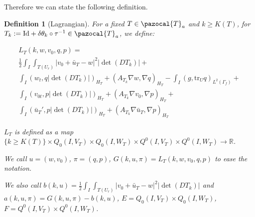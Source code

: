 \documentclass[english,a4paper,10pt,oneside]{scrbook}	%
\theoremstyle{break}
\newtheorem{defn}[equation]{Definition}
\theoremstyle{remark}
\newcommand{\mR}{\mathbb{R}}
\newcommand{\tr}{\text{tr}}
\newcommand{\cT}{\pazocal{T}}
\newcommand{\id}{\text{Id}}
\newcommand{\te}{\theta}
\begin{document}
Therefore we can state the following definition.

\begin{defn}[Lagrangian]

For a fixed $T \in \cT_a$ and  $k\geq K(T)$, for $T_k:=\id+\delta\te_k \circ \tau^{-1} \in \cT_a$, we define:

\begin{align*}
L_T(k,w,v_0,q,p) = \\
\frac{1}{2}\int_I \int_{T(U_r)}|v_0+\bar{u}_T - w|^2|\det(DT_k)|+\\
\int_I ( w_t , q |\det(DT_k)|)_{H_T}+ (A_{T_k}\nabla w, \nabla q)_{H_T} -\int_I(g,\tr_{U} q)_{L^2(\Gamma_f)} +\\ \int_I (v_{0t},p |\det(DT_k)|)_{H_T} + (A_{T_k} \nabla v_0, \nabla p)_{H_T}+\\\int_I(\bar{u}_T',p|\det(DT_k)|)_{H_T}+(A_{T_k} \nabla \bar{u}_T , \nabla p)_{H_T}
\end{align*}

$L_T$ is defined as a map $\{k\geq K(T)\}\times Q_0(I, V_T)\times Q_0(I,W_T)\times Q^0(I, V_T)\times Q^0(I, W_T)\rightarrow \mR$.

We call $u = (w,v_0)$, $\pi = (q,p)$, $G(k,u,\pi) = L_T(k,w,v_0,q,p)$ to ease the notation.

We also call $b(k, u) = \frac{1}{2}\int_I \int_{T(U_r)}|v_0+\bar{u}_T - w|^2|\det(DT_k)|$ and $a(k, u,\pi) = G(k,u,\pi)-b(k, u)$, $E = Q_0(I, V_T)\times Q_0(I,W_T)$, $F=Q^0(I, V_T)\times Q^0(I, W_T)$.

\end{defn}
\end{document}
